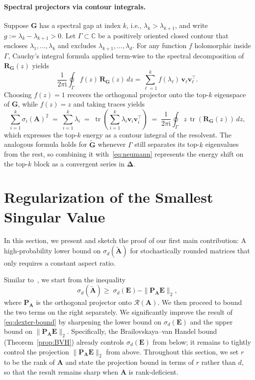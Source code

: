 \documentclass{article}
\newcommand{\twonorm}[1]{\|#1\|_2}
\newcommand{\ts}{\top}
\newcommand{\vb}{\mathbf{v}}
\newcommand{\Ab}{\mathbf{A}}
\newcommand{\Eb}{\mathbf{E}}
\newcommand{\Gb}{\mathbf{G}}
\newcommand{\Pb}{\mathbf{P}}
\newcommand{\Rb}{\mathbf{R}}
\newcommand{\Abtil}{\tilde{\Ab}}
\newcommand{\Gbtil}{\tilde{\Gb}}
\newcommand{\tr}{\mathop{\mathrm{tr}}}
\newcommand{\rbr}[1]{\left(#1\right)}
\newcommand{\Deltab}{\boldsymbol{\Delta}}
\begin{document}
\paragraph{Spectral projectors via contour integrals.} Suppose $\Gb$ has a spectral gap at index $k$, i.e., $\lambda_k > \lambda_{k+1}$, and write $g := \lambda_k - \lambda_{k+1} > 0$. Let $\Gamma \subset \mathbb{C}$ be a positively oriented closed contour that encloses $\lambda_1,\dots,\lambda_k$ and excludes $\lambda_{k+1},\dots,\lambda_d$. For any function $f$ holomorphic inside $\Gamma$, Cauchy's integral formula applied term-wise to the spectral decomposition of $\Rb_\Gb(z)$ yields
\begin{equation}\label{eq:contour-projector}
    \frac{1}{2\pi \mathrm{i}}\oint_\Gamma f(z)\,\Rb_\Gb(z)\,dz = \sum_{\ell=1}^{k} f(\lambda_\ell)\,\vb_\ell\vb_\ell^\top.
\end{equation}
Choosing $f(z) = 1$ recovers the orthogonal projector onto the top-$k$ eigenspace of $\Gb$, while $f(z) = z$ and taking traces yields
\begin{equation} \label{eq:trace_contour}
    \sum_{i=1}^{k}\sigma_i(\Ab)^2 \;=\; \sum_{i=1}^{k}\lambda_i \;=\; \tr\rbr{\sum_{i=1}^k \lambda_i \vb_i \vb_i^\ts} \;=\; \frac{1}{2\pi \mathrm{i}}\oint_\Gamma z\,\tr\rbr{\Rb_\Gb(z)}\,dz,
\end{equation}
which expresses the top-$k$ energy as a contour integral of the resolvent. The analogous formula holds for $\Gbtil$ whenever $\Gamma$ still separates its top-$k$ eigenvalues from the rest, so combining it with~\eqref{eq:neumann} represents the energy shift on the top-$k$ block as a convergent series in $\Deltab$.
% 
\section{Regularization of the Smallest Singular Value} \label{sec:smallsv}

In this section, we present and sketch the proof of our first main contribution: A high-probability lower bound on $\sigma_d(\Abtil)$ for stochastically rounded matrices that only requires a constant aspect ratio.

Similar to~\cite{dexter2025stochastic}, we start from the inequality 
%
\begin{equation}\label{eq:sigma-decomp}
    \sigma_d(\Abtil) \ge\; \sigma_d(\Eb) - \twonorm{\Pb_\Ab \Eb},
\end{equation}
%
where $\Pb_\Ab$ is the orthogonal projector onto $\mathcal{R}(\Ab)$. We then proceed to bound the two terms on the right separately. We significantly improve the result of \eqref{eq:dexter-bound} by sharpening the lower bound on $\sigma_d(\Eb)$ and the upper bound on $\twonorm{\Pb_\Ab \Eb}$. Specifically, the Brailovskaya--van Handel bound (Theorem~\ref{prop:BVH}) already controls $\sigma_d(\Eb)$ from below; it remains to tightly control the projection $\twonorm{\Pb_\Ab \Eb}$ from above. Throughout this section, we set $r$ to be the rank of $\Ab$ and state the projection bound in terms of $r$ rather than $d$, so that the result remains sharp when $\Ab$ is rank-deficient.
\end{document}
